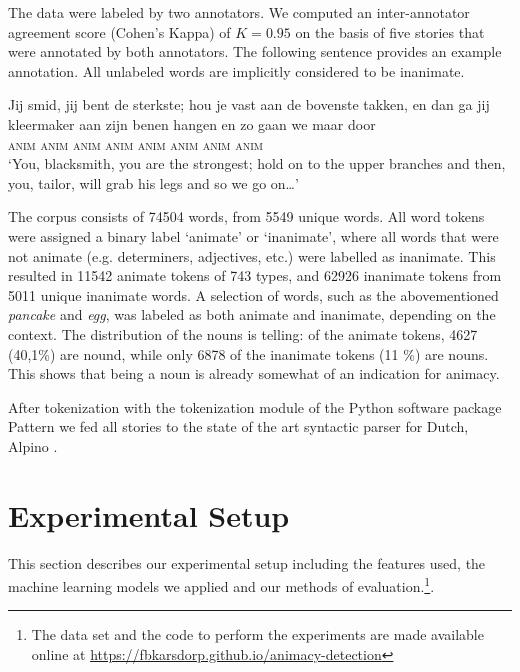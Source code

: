\documentclass[a4paper,UKenglish]{oasics}
\begin{document}
The data were labeled by two annotators. We computed an
inter-annotator agreement score (Cohen's Kappa) of $K=0.95$ on the
basis of five stories that were annotated by both annotators. The
following sentence provides an example annotation. All unlabeled words
are implicitly considered to be inanimate.
\begin{exe}
\ex
\gll Jij smid, jij bent de sterkste; hou je vast aan de bovenste
takken, en dan ga jij kleermaker aan zijn benen hangen en zo gaan we maar door\\
    \textsc{anim} \textsc{anim} \textsc{anim} {} {} {} {} \textsc{anim} {} {} {} {} {} {} {} {} \textsc{anim} \textsc{anim}
    {} \textsc{anim} {} {} {} {} {} \textsc{anim} {} {} \\
\trans `You, blacksmith, you are the strongest; hold on to the upper
branches and then, you, tailor, will grab his legs and so we go on\ldots'
\end{exe}
The corpus consists of 74504 words, from 5549 unique words. All word
tokens were assigned a binary label `animate' or `inanimate', where
all words that were not animate (e.g. determiners, adjectives, etc.)
were labelled as inanimate. This resulted in 11542 animate tokens of
743 types, and 62926 inanimate tokens from 5011 unique inanimate
words. A selection of words, such as the abovementioned
\textit{pancake} and \textit{egg}, was labeled as both animate and
inanimate, depending on the context. The distribution of the nouns is
telling: of the animate tokens, 4627 (40,1\%) are nound, while only
6878 of the inanimate tokens (11 \%) are nouns. This shows that being
a noun is already somewhat of an indication for animacy.

After tokenization with the tokenization module of the Python software
package Pattern \cite{smedt:12} we fed all stories to the
state of the art syntactic parser for Dutch, Alpino \cite{bouma:01}.


\section{Experimental Setup}\label{sec:models}
This section describes our experimental setup including the features
used, the machine learning models we applied and our methods of
evaluation.\footnote{The data set and the code to perform the
  experiments are made available online at
  \url{https://fbkarsdorp.github.io/animacy-detection}}.
\end{document}
